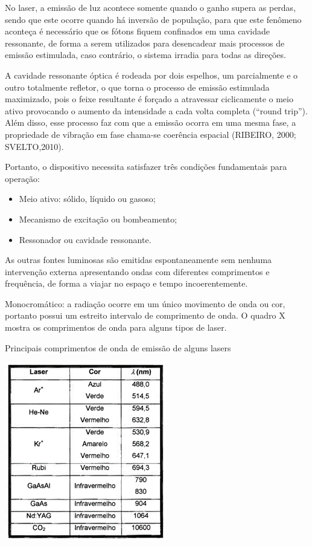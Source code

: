 \documentclass[numeric]{fei}
\begin{document}
No laser, a emissão de luz acontece somente quando o ganho supera as perdas, sendo que este ocorre quando há inversão de população, para que este fenômeno aconteça é necessário que os fótons fiquem confinados em uma cavidade ressonante, de forma a serem utilizados para desencadear mais processos de emissão estimulada, caso contrário, o sistema irradia para todas as direções.

A cavidade ressonante óptica é rodeada por dois espelhos, um parcialmente e o outro totalmente refletor, o que torna o processo de emissão estimulada maximizado, pois o feixe resultante é forçado a atravessar ciclicamente o meio ativo provocando o aumento da intensidade a cada volta completa (“round trip”). Além disso, esse processo faz com que a emissão ocorra em uma mesma fase, a propriedade de vibração em fase chama-se coerência espacial (RIBEIRO, 2000; SVELTO,2010).

Portanto, o dispositivo necessita satisfazer três condições fundamentais para operação:

\begin{itemize}
	\item Meio ativo: sólido, líquido ou gasoso;
	\item Mecanismo de excitação ou bombeamento;
	\item Ressonador ou cavidade ressonante.
\end{itemize}

As outras fontes luminosas são emitidas espontaneamente sem nenhuma intervenção externa apresentando ondas com diferentes comprimentos e frequência, de forma a viajar no espaço e tempo incoerentemente.

Monocromático: a radiação ocorre em um único movimento de onda ou cor, portanto possui um estreito intervalo de comprimento de onda. O quadro X mostra os comprimentos de onda para alguns tipos de laser.

\begin{quadro}
\centering
\caption{Principais comprimentos de onda de emissão de alguns lasers}
\includegraphics{tabela_laser}
\end{quadro}
\end{document}
